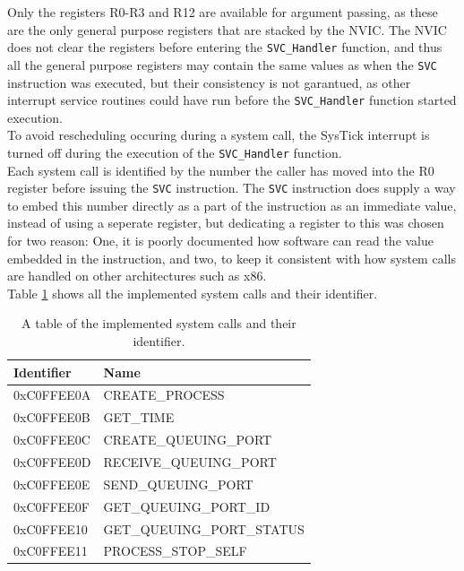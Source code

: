 Only the registers R0-R3 and R12 are available for argument passing, as these
are the only general purpose registers that are stacked by the NVIC. The NVIC
does not clear the registers before entering the \texttt{SVC\_Handler} function,
and thus all the general purpose registers may contain the same values as when
the \texttt{SVC} instruction was executed, but their consistency is not
garantued, as other interrupt service routines could have run before the
\texttt{SVC\_Handler} function started execution.\\
To avoid rescheduling occuring during a system call, the SysTick interrupt is
turned off during the execution of the \texttt{SVC\_Handler} function.\\
Each system call is identified by the number the caller has moved into the R0
register before issuing the \texttt{SVC} instruction. The \texttt{SVC}
instruction does supply a way to embed this number directly as a part of the
instruction as an immediate value, instead of using a seperate register, but
dedicating a register to this was chosen for two reason: One, it is poorly
documented how software can read the value embedded in the instruction, and two,
to keep it consistent with how system calls are handled on other architectures
such as x86.\\
Table \ref{tab:syscalls} shows all the implemented system calls and their
identifier.

\begin{table}
\centering
	\begin{tabular}{| l | l |}
		\hline
		Identifier		&	Name \\
		\hline
		0xC0FFEE0A		&	CREATE\_PROCESS 			\\
		\hline
		0xC0FFEE0B		&	GET\_TIME					\\
		\hline
		0xC0FFEE0C		&	CREATE\_QUEUING\_PORT 		\\
		\hline
		0xC0FFEE0D		&	RECEIVE\_QUEUING\_PORT 		\\
		\hline
		0xC0FFEE0E		&	SEND\_QUEUING\_PORT 		\\
		\hline
		0xC0FFEE0F		&	GET\_QUEUING\_PORT\_ID 		\\
		\hline
		0xC0FFEE10		&	GET\_QUEUING\_PORT\_STATUS	\\
		\hline
		0xC0FFEE11		&	PROCESS\_STOP\_SELF 		\\
		\hline		
	\end{tabular}
\caption{A table of the implemented system calls and their identifier.}
\label{tab:syscalls}
\end{table}

